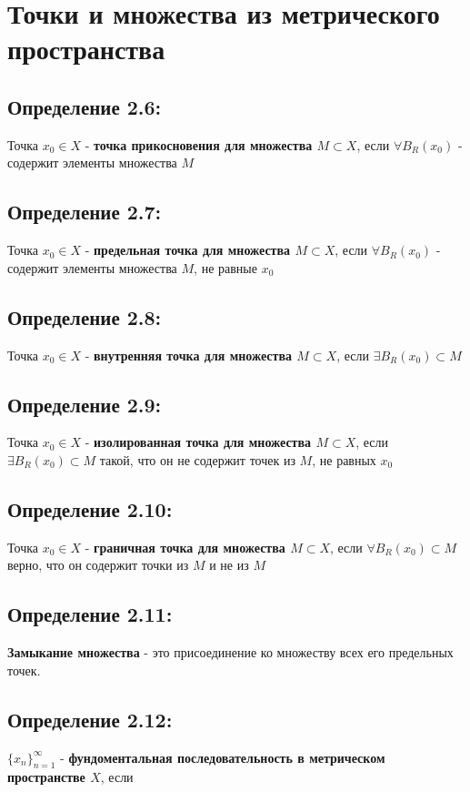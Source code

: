 \documentclass[12pt]{article}
\begin{document}
\newpage
\section{Точки и множества из метрического пространства}	

\subsection*{Определение 2.6:}
	 Точка $x_0 \in X$ - \textbf{точка прикосновения для множества $M \subset X$}, если $\forall B_R (x_0)$ - содержит элементы множества $M$
	    
\subsection*{Определение 2.7:}
	 Точка $x_0 \in X$ - \textbf{предельная точка для множества $M \subset X$}, если $\forall B_R (x_0)$ - содержит элементы множества $M$,
	 не равные $x_0$
	
\subsection*{Определение 2.8:}
	 Точка $x_0 \in X$ - \textbf{внутренняя точка для множества $M \subset X$}, если $\exists B_R (x_0) \subset M$
	
\subsection*{Определение 2.9:}
	 Точка $x_0 \in X$ - \textbf{изолированная точка для множества $M \subset X$}, если $\exists B_R (x_0) \subset M$ такой, что
	 он не содержит точек из $M$, не равных $x_0$

\subsection*{Определение 2.10:}
	 Точка $x_0 \in X$ - \textbf{граничная точка для множества $M \subset X$}, если $\forall B_R (x_0) \subset M$ 
	 верно, что он содержит точки из $M$ и не из $M$

\subsection*{Определение 2.11:}
	 \textbf{Замыкание множества} - это присоединение ко множеству всех его предельных точек.

\subsection*{Определение 2.12:}
	 $\{{x_n}\}_{n = 1}^{\infty}$ - \textbf{фундоментальная последовательность в метрическом пространстве $X$}, если
	 
\end{document}
